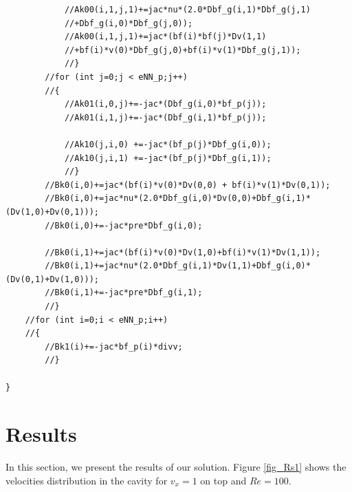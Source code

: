 \documentclass[]{article}
\begin{document}
\begin{lstlisting}
			//Ak00(i,1,j,1)+=jac*nu*(2.0*Dbf_g(i,1)*Dbf_g(j,1)
			//+Dbf_g(i,0)*Dbf_g(j,0));
			//Ak00(i,1,j,1)+=jac*(bf(i)*bf(j)*Dv(1,1)
			//+bf(i)*v(0)*Dbf_g(j,0)+bf(i)*v(1)*Dbf_g(j,1));
			//}
		//for (int j=0;j < eNN_p;j++)
		//{
			//Ak01(i,0,j)+=-jac*(Dbf_g(i,0)*bf_p(j));
			//Ak01(i,1,j)+=-jac*(Dbf_g(i,1)*bf_p(j));
			
			//Ak10(j,i,0) +=-jac*(bf_p(j)*Dbf_g(i,0));
			//Ak10(j,i,1) +=-jac*(bf_p(j)*Dbf_g(i,1));
			//}
		//Bk0(i,0)+=jac*(bf(i)*v(0)*Dv(0,0) + bf(i)*v(1)*Dv(0,1));
		//Bk0(i,0)+=jac*nu*(2.0*Dbf_g(i,0)*Dv(0,0)+Dbf_g(i,1)*(Dv(1,0)+Dv(0,1)));
		//Bk0(i,0)+=-jac*pre*Dbf_g(i,0);
		
		//Bk0(i,1)+=jac*(bf(i)*v(0)*Dv(1,0)+bf(i)*v(1)*Dv(1,1));
		//Bk0(i,1)+=jac*nu*(2.0*Dbf_g(i,1)*Dv(1,1)+Dbf_g(i,0)*(Dv(0,1)+Dv(1,0)));
		//Bk0(i,1)+=-jac*pre*Dbf_g(i,1);
		//}
	//for (int i=0;i < eNN_p;i++)
	//{
		//Bk1(i)+=-jac*bf_p(i)*divv;
		//}
	
}

\end{lstlisting}
\section{Results} \label{sec: rst}
In this section, we present the results of our solution. Figure \ref{fig_Rs1} shows the velocities distribution in the cavity for $v_x=1$ on top and $Re=100$.
\end{document}

